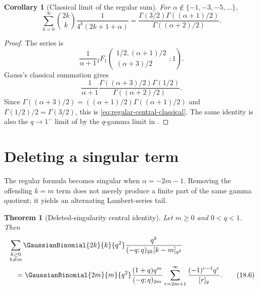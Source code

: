 \documentclass[11pt,a4paper,oneside,openany]{book}
\newtheorem{theorem}{Theorem}[chapter]
\newtheorem{corollary}[corollary]{Corollary}
\theoremstyle{definition}
\theoremstyle{remark}
\begin{document}
\begin{corollary}[Classical limit of the regular sum]\label{cor:regular-central-classical}
For $\alpha\notin\{-1,-3,-5,\ldots\}$,
\[
 \sum_{k=0}^{\infty}\binom{2k}{k}
 \frac1{4^k(2k+1+\alpha)}
 =\frac{\Gamma(3/2)\Gamma((\alpha+1)/2)}
        {\Gamma((\alpha+2)/2)}.
 \tag{18.5}\label{eq:regular-central-classical}
\]
\end{corollary}

\begin{proof}
The series is
\[
 \frac1{\alpha+1}
 {}_2F_1\!\left(
 \begin{matrix}1/2,(\alpha+1)/2\\(\alpha+3)/2\end{matrix};1\right).
\]
Gauss's classical summation gives
\[
 \frac1{\alpha+1}
 \frac{\Gamma((\alpha+3)/2)\Gamma(1/2)}
      {\Gamma((\alpha+2)/2)}.
\]
Since $\Gamma((\alpha+3)/2)=((\alpha+1)/2)\Gamma((\alpha+1)/2)$ and $\Gamma(1/2)/2=\Gamma(3/2)$, this is \eqref{eq:regular-central-classical}.  The same identity is also the $q\to1^-$ limit of  by the $q$-gamma limit in .
\end{proof}

\section{Deleting a singular term}

The regular formula becomes singular when $\alpha=-2m-1$.  Removing the offending $k=m$ term does not merely produce a finite part of the same gamma quotient; it yields an alternating Lambert-series tail.

\begin{theorem}[Deleted-singularity central identity]\label{thm:singular-central}
Let $m\ge0$ and $0<q<1$.  Then
\begin{align}
 &\sum_{\substack{k\ge0\\k\ne m}}
 \GaussianBinomial{2k}{k}{q^2}
 \frac{q^k}{(-q;q)_{2k}[k-m]_{q^2}}
 \notag\\
 &\quad=
 \GaussianBinomial{2m}{m}{q^2}
 \frac{(1+q)q^m}{(-q;q)_{2m}}
 \sum_{r=2m+1}^{\infty}
 \frac{(-1)^{r-1}q^r}{[r]_q}.
 \tag{18.6}\label{eq:singular-central}
\end{align}
\end{theorem}
\end{document}
